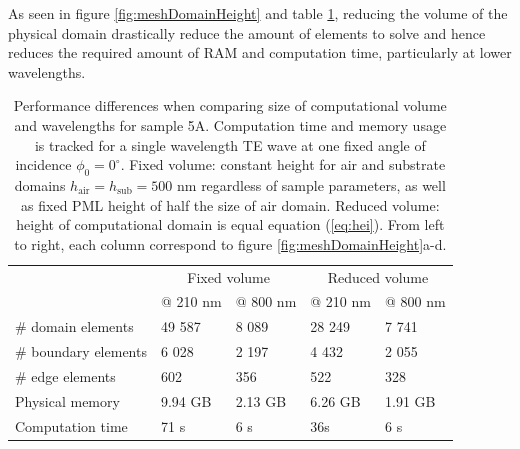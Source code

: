 As seen in figure \ref{fig:meshDomainHeight} and table \ref{tab:domainHeight}, reducing the volume of the physical domain drastically reduce the amount of elements to solve and hence reduces the required amount of RAM and computation time, particularly at lower wavelengths.

 \begin{table}[htb!]
    \centering
    \caption{Performance differences when comparing size of computational volume and wavelengths for sample 5A. Computation time and memory usage is tracked for a single wavelength TE wave at one fixed angle of incidence $\phi_0=0^\circ$. Fixed volume: constant height for air and substrate domains $h_{\text{air}}=h_{\text{sub}}=500$ nm regardless of sample parameters, as well as fixed PML height of half the size of air domain. Reduced volume: height of computational domain is equal equation (\ref{eq:hei}). From left to right, each column correspond to figure \ref{fig:meshDomainHeight}a-d.}
    \label{tab:domainHeight}
    \begin{tabular}{l l l l l}
    & \multicolumn{2}{c}{Fixed volume} & \multicolumn{2}{c}{Reduced volume} \\
            &   @ 210 nm    &  @ 800 nm    &  @ 210 nm        & @ 800 nm \\
    \hline 
    $\#$ domain elements    &   49 587      &   8 089       &   28 249      &   7 741\\
    $\#$ boundary elements  &   6 028       &   2 197       &   4 432       &   2 055\\
    $\#$ edge elements      &   602         &   356         &   522         &   328\\
    Physical memory         &   9.94 GB      &   2.13 GB      &   6.26 GB      &   1.91 GB\\
    Computation time        &   71 s    &   6 s          &   36s          &   6 s\\ %
    \hline
    \end{tabular}
\end{table}



